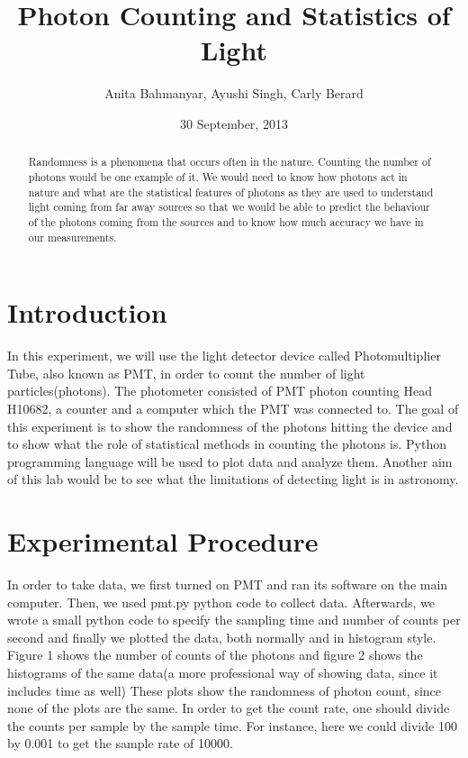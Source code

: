 \documentclass[letterpaper,12pt]{article}
\begin{document}
\onehalfspacing
\title{Photon Counting and Statistics of Light}
\author{Anita Bahmanyar, Ayushi Singh, Carly Berard}
\date{30 September, 2013}

\maketitle
\begin{abstract}
\label{abstract}
Randomness is a phenomena that occurs often in the nature. Counting the number of photons would be one example of it. We would need to know how photons act in nature and what are the statistical features of photons as they are used to understand light coming from far away sources so that we would be able to predict the behaviour of the photons coming from the sources and to know how much accuracy we have in our measurements.
 
\end{abstract}

\section{Introduction}
\label{sec:introduction}
In this experiment, we will use the light detector device called Photomultiplier Tube, also known as PMT, in order to count the number of light particles(photons). The photometer consisted of PMT photon counting Head H10682, a counter and a computer which the PMT was connected to. The goal of this experiment is to show the randomness of the photons hitting the device and to show what the role of statistical methods in counting the photons is. Python programming language will be used to plot data and analyze them. Another aim of this lab would be to see what the limitations of detecting light is in astronomy.

\section{Experimental Procedure}
\label{sec:experimental procedure}
In order to take data, we first turned on PMT and ran its software on the main computer. Then, we used pmt.py python code to collect data. Afterwards, we wrote a small python code to  specify the sampling time and number of counts per second and finally we plotted the data, both normally and in histogram style. Figure 1 shows the number of counts of the photons and figure 2 shows the histograms of the same data(a more professional way of showing data, since it includes time as well) These plots show the randomness of photon count, since none of the plots are the same. In order to get the count rate, one should divide the counts per sample by the sample time. For instance, here we could divide 100 by 0.001 to get the sample rate of 10000.
\end{document}
